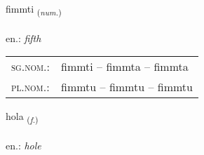 \documentclass[frontgrid, backgrid]{flacards}\usepackage[]{graphicx}\usepackage[]{xcolor}
\begin{document}
\renewcommand{\flhead}{\vskip5pt \fboxsep=0pt {\small\bfseries\footnotesize Töluorð | Numeral}}
\renewcommand{\fcfoot}{\vskip5pt \fboxsep=0pt \hspace{2pt}{\small\bfseries\footnotesize 2K}}

\renewcommand{\blhead}{\vskip5pt {\small\bfseries\footnotesize Töluorð | Numeral }}
\renewcommand{\bcfoot}{\vskip5pt \hspace{2pt}{\small\bfseries\footnotesize 2K}}


{fimmti \small{\textsubscript{(\textit{num.})}} \\[1ex] %
\textphonetic{[fɪm̥tɪ]} \\
en.: \emph{fifth} \\  [2ex]
\renewcommand*{\arraystretch}{0.8}
\begin{tabular}{ll}
\textsc{sg.nom.}: & fimmti  --  fimmta -- fimmta \\ 
\textsc{pl.nom.}: & fimmtu -- fimmtu -- fimmtu
\end{tabular}
}

\renewcommand{\flhead}{\vskip5pt \fboxsep=0pt {\small\bfseries\footnotesize Nafnorð | Noun}}
\renewcommand{\fcfoot}{\vskip5pt \fboxsep=0pt \hspace{2pt}{\small\bfseries\footnotesize 2K}}

\renewcommand{\blhead}{\vskip5pt {\small\bfseries\footnotesize Nafnorð | Noun }}
\renewcommand{\bcfoot}{\vskip5pt \hspace{2pt}{\small\bfseries\footnotesize 2K}}


{hola \small{\textsubscript{(\textit{f.})}} \\[1ex] %
\textphonetic{[hɔːla]} \\
en.: \emph{hole} \\  [2ex]
\renewcommand*{\arraystretch}{0.8}
}
\end{document}
